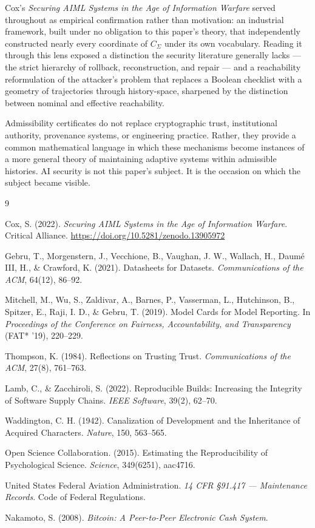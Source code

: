 \documentclass[11pt]{article}
\begin{document}
Cox's \emph{Securing AIML Systems in the Age of Information Warfare} served throughout as empirical confirmation rather than motivation: an industrial framework, built under no obligation to this paper's theory, that independently constructed nearly every coordinate of $C_\Sigma$ under its own vocabulary. Reading it through this lens exposed a distinction the security literature generally lacks --- the strict hierarchy of rollback, reconstruction, and repair --- and a reachability reformulation of the attacker's problem that replaces a Boolean checklist with a geometry of trajectories through history-space, sharpened by the distinction between nominal and effective reachability.

Admissibility certificates do not replace cryptographic trust, institutional authority, provenance systems, or engineering practice. Rather, they provide a common mathematical language in which these mechanisms become instances of a more general theory of maintaining adaptive systems within admissible histories. AI security is not this paper's subject. It is the occasion on which the subject became visible.

\begin{thebibliography}{9}

Cox, S. (2022). \emph{Securing AIML Systems in the Age of Information Warfare}. Critical Alliance. \url{https://doi.org/10.5281/zenodo.13905972}

Gebru, T., Morgenstern, J., Vecchione, B., Vaughan, J. W., Wallach, H., Daum\'e III, H., \& Crawford, K. (2021). Datasheets for Datasets. \emph{Communications of the ACM}, 64(12), 86--92.

Mitchell, M., Wu, S., Zaldivar, A., Barnes, P., Vasserman, L., Hutchinson, B., Spitzer, E., Raji, I. D., \& Gebru, T. (2019). Model Cards for Model Reporting. In \emph{Proceedings of the Conference on Fairness, Accountability, and Transparency} (FAT* '19), 220--229.

Thompson, K. (1984). Reflections on Trusting Trust. \emph{Communications of the ACM}, 27(8), 761--763.

Lamb, C., \& Zacchiroli, S. (2022). Reproducible Builds: Increasing the Integrity of Software Supply Chains. \emph{IEEE Software}, 39(2), 62--70.

Waddington, C. H. (1942). Canalization of Development and the Inheritance of Acquired Characters. \emph{Nature}, 150, 563--565.

Open Science Collaboration. (2015). Estimating the Reproducibility of Psychological Science. \emph{Science}, 349(6251), aac4716.

United States Federal Aviation Administration. \emph{14 CFR \S 91.417 --- Maintenance Records}. Code of Federal Regulations.

Nakamoto, S. (2008). \emph{Bitcoin: A Peer-to-Peer Electronic Cash System}.

\end{thebibliography}
\end{document}
